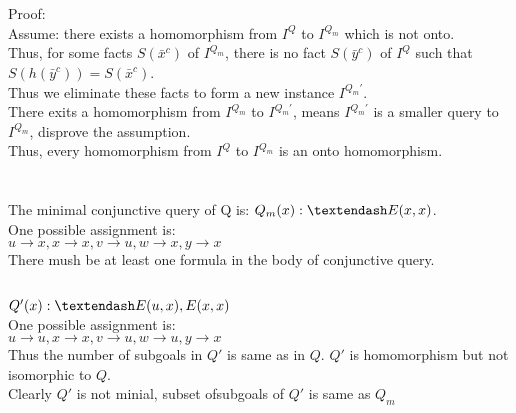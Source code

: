 \documentclass{article}
\begin{document}
\section{}
Proof:\\
Assume: there exists a homomorphism from $I^{Q}$ to $I^{Q_{m}}$ which is not onto.\\
Thus, for some facts $S(\bar{x}^{c})$ of $I^{Q_{m}}$, there is no fact $S(\bar{y}^{c})$ of $I^{Q}$ such that $S(h(\bar{y}^{c}))=S(\bar{x}^{c})$.\\
Thus we eliminate these facts to form a new instance $I^{Q_{m}'}$.\\
There exits a homomorphism from $I^{Q_{m}}$ to $I^{Q_{m}'}$, means $I^{Q_{m}'}$ is a smaller query to $I^{Q_{m}}$, disprove the assumption.\\
Thus, every homomorphism from $I^{Q}$ to $I^{Q_{m}}$ is an onto homomorphism.\\
\section{}
\subsection{}
The minimal conjunctive query of Q is: $Q_{m}(x):\textendash E(x,x)$.\\
One possible assignment is:\\
$u\rightarrow x, x\rightarrow x,v\rightarrow u,w\rightarrow x,y \rightarrow x$\\
There mush be at least one formula in the body of conjunctive query.\\
\subsection{}
$Q'(x):\textendash E(u,x),E(x,x)$\\
One possible assignment is:\\
$u\rightarrow u, x\rightarrow x,v\rightarrow u, w\rightarrow u,y \rightarrow x$\\
Thus the number of subgoals in $Q'$ is same as in $Q$. $Q'$ is homomorphism but not isomorphic to $Q$.\\ 
Clearly $Q'$ is not minial, subset ofsubgoals of $Q'$ is same as $Q_{m}$\\
\end{document}

